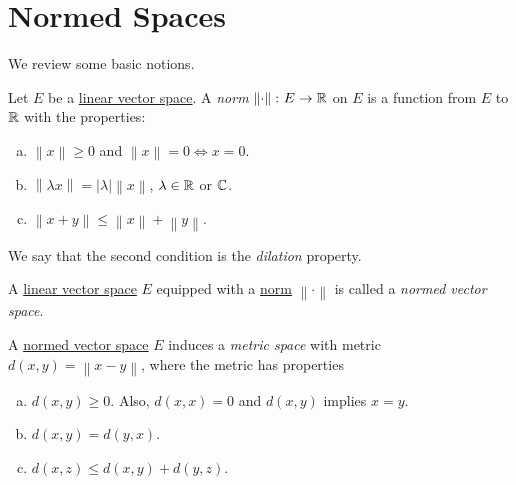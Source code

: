 \section{Normed Spaces}
We review some basic notions.

\begin{definition}[Norm]\label{def:norm}
	Let \(E\) be a \hyperref[def:linear-vector-space]{linear vector space}. A \emph{norm} \(\left\lVert \cdot \right\rVert \colon E \to \mathbb{\MakeUppercase{r}} \) on \(E\) is a function from \(E\) to \(\mathbb{\MakeUppercase{r}} \) with the properties:
	\begin{enumerate}[(a)]
		\item \(\left\lVert x\right\rVert \geq 0\) and \(\left\lVert x\right\rVert =0 \iff x=0\).
		\item \(\left\lVert \lambda x\right\rVert = \left\vert \lambda  \right\vert \left\lVert x\right\rVert\), \(\lambda \in\mathbb{\MakeUppercase{r}} \) or \(\mathbb{\MakeUppercase{c}} \).
		\item \(\left\lVert x+y\right\rVert \leq \left\lVert x\right\rVert + \left\lVert y\right\rVert \).
	\end{enumerate}
\end{definition}

\begin{notation}[Dilation]
	We say that the second condition is the \emph{dilation} property.
\end{notation}

\begin{definition}\label{def:normed-vector-space}
	A \hyperref[def:linear-vector-space]{linear vector space} \(E\) equipped with a \hyperref[def:norm]{norm} \(\left\lVert \cdot\right\rVert \) is called a \emph{normed vector space}.
\end{definition}

\begin{remark}
	A \hyperref[def:normed-vector-space]{normed vector space} \(E\) induces a \emph{metric space} with metric \(d(x, y) = \left\lVert x- y\right\rVert \), where the metric has properties
	\begin{enumerate}[(a)]
		\item \(d(x, y) \geq 0\). Also, \(d(x, x) = 0\) and \(d(x, y)\) implies \(x =y\).
		\item \(d(x, y) = d(y, x)\).
		\item \(d(x, z) \leq d(x, y) + d(y, z)\).
	\end{enumerate}
\end{remark}


